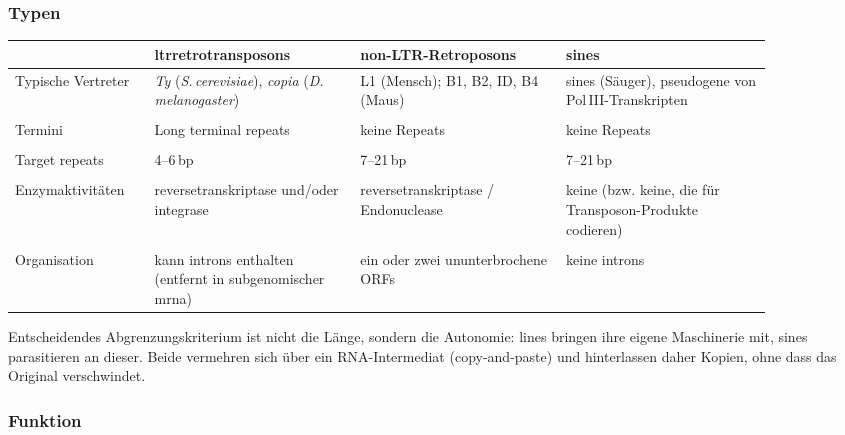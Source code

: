 \subsubsection{Typen}
\begin{mytable}
    \begin{tabular}{@{}p{0.16\linewidth}p{0.24\linewidth}p{0.24\linewidth}p{0.24\linewidth}@{}}
        \hline
        & \textbf{\gls{ltrretrotransposon}s} & \textbf{non-LTR-Retroposons} & \textbf{\gls{sine}s} \\
        \hline
        Typische Vertreter
        & \emph{Ty} (\emph{S.\,cerevisiae}), \emph{copia} (\emph{D.\,melanogaster})
        & L1 (Mensch); B1, B2, ID, B4 (Maus)
        & \gls{sine}s (Säuger), \gls{pseudogen}e von Pol\,III-Transkripten
        \\ \\
        Termini
        & Long terminal repeats
        & keine Repeats
        & keine Repeats \\ \\
        Target repeats
        & 4--6\,bp
        & 7--21\,bp
        & 7--21\,bp \\ \\
        Enzymaktivitäten
        & \gls{reversetranskriptase} und/oder \gls{integrase}
        & \gls{reversetranskriptase} / Endonuclease
        & keine (bzw.
        keine, die für Transposon-Produkte codieren) \\ \\
        Organisation
        & kann \gls{intron}s enthalten (entfernt in subgenomischer \gls{mrna})
        & ein oder zwei ununterbrochene ORFs
        & keine \gls{intron}s \\
        \hline
    \end{tabular}
\end{mytable}

\begin{bem}
    Entscheidendes Abgrenzungskriterium ist nicht die Länge, sondern die
    Autonomie: \gls{line}s bringen ihre eigene Maschinerie mit, \gls{sine}s
    parasitieren an dieser.
    Beide vermehren sich über ein RNA-Intermediat
    (copy-and-paste) und hinterlassen daher Kopien, ohne dass das Original
    verschwindet.
\end{bem}

\subsubsection{Funktion}

